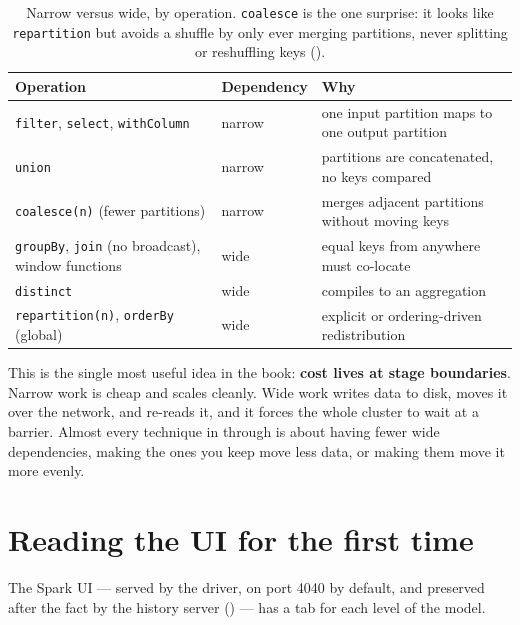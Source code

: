 \begin{table}[H]
\centering\footnotesize
\renewcommand{\arraystretch}{1.2}
\begin{tabular}{@{}P{6.6cm}P{2cm}P{5cm}@{}}
\toprule
\textbf{Operation} & \textbf{Dependency} & \textbf{Why} \\
\midrule
\texttt{filter}, \texttt{select}, \texttt{withColumn} & narrow & one input partition maps to one output partition \\
\texttt{union} & narrow & partitions are concatenated, no keys compared \\
\texttt{coalesce(n)} (fewer partitions) & narrow & merges adjacent partitions without moving keys \\
\texttt{groupBy}, \texttt{join} (no broadcast), window functions & wide & equal keys from anywhere must co-locate \\
\texttt{distinct} & wide & compiles to an aggregation \\
\texttt{repartition(n)}, \texttt{orderBy} (global) & wide & explicit or ordering-driven redistribution \\
\bottomrule
\end{tabular}
\caption{Narrow versus wide, by operation. \texttt{coalesce} is the one
surprise: it looks like \texttt{repartition} but avoids a shuffle by only ever
merging partitions, never splitting or reshuffling keys
().}
\label{tab:shape-narrow-wide}
\end{table}

This is the single most useful idea in the book: \textbf{cost lives at stage
boundaries}. Narrow work is cheap and scales cleanly. Wide work writes data to
disk, moves it over the network, and re-reads it, and it forces the whole cluster
to wait at a barrier. Almost every technique in  through
 is about having fewer wide dependencies, making the ones you
keep move less data, or making them move it more evenly.

\section{Reading the UI for the first time}
\label{sec:shape-ui}

The Spark UI --- served by the driver, on port 4040 by default, and preserved
after the fact by the history server () --- has a tab
for each level of the model.

